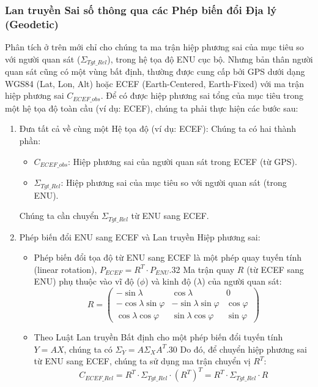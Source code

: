 \subsubsection{Lan truyền Sai số thông qua các Phép biến đổi Địa lý (Geodetic)}
Phân tích ở trên mới chỉ cho chúng ta ma trận hiệp phương sai của mục tiêu so với người quan sát ($\Sigma_{Tgt\_Rel}$), trong hệ tọa độ ENU cục bộ. Nhưng bản thân người quan sát cũng có một vùng bất định, thường được cung cấp bởi GPS dưới dạng WGS84 (Lat, Lon, Alt) hoặc ECEF (Earth-Centered, Earth-Fixed) với ma trận hiệp phương sai $C_{ECEF\_obs}$.
Để có được hiệp phương sai tổng của mục tiêu trong một hệ tọa độ toàn cầu (ví dụ: ECEF), chúng ta phải thực hiện các bước sau:
\begin{enumerate}
    \item  Đưa tất cả về cùng một Hệ tọa độ (ví dụ: ECEF): Chúng ta có hai thành phần:
    \begin{itemize}
        \item $C_{ECEF\_obs}$: Hiệp phương sai của người quan sát trong ECEF (từ GPS).
        \item $\Sigma_{Tgt\_Rel}$: Hiệp phương sai của mục tiêu so với người quan sát (trong ENU).
    \end{itemize}
    Chúng ta cần chuyển $\Sigma_{Tgt\_Rel}$ từ ENU sang ECEF.
    \item Phép biến đổi ENU sang ECEF và Lan truyền Hiệp phương sai:
    \begin{itemize}
        \item 
Phép biến đổi tọa độ từ ENU sang ECEF là một phép quay tuyến tính (linear rotation), $P_{ECEF} = R^T \cdot P_{ENU}$.32 Ma trận quay $R$ (từ ECEF sang ENU) phụ thuộc vào vĩ độ ($\phi$) và kinh độ ($\lambda$) của người quan sát:
$$ R = \begin{pmatrix} -\sin \lambda & \cos \lambda &0 \\ - \cos \lambda \sin \varphi & -\sin \lambda \sin \varphi & \cos \varphi\\ \cos \lambda \cos \varphi & \sin \lambda \cos \varphi & \sin \varphi\ \end{pmatrix} $$
        \item Theo Luật Lan truyền Bất định cho một phép biến đổi tuyến tính $Y = A X$, chúng ta có $\Sigma_Y = A \Sigma_X A^T$.30 Do đó, để chuyển hiệp phương sai từ ENU sang ECEF, chúng ta sử dụng ma trận chuyển vị $R^T$:
        $$C_{ECEF\_Rel} = R^T \cdot \Sigma_{Tgt\_Rel} \cdot (R^T)^T = R^T \cdot \Sigma_{Tgt\_Rel} \cdot R$$
        

\end{itemize}
\end{enumerate}
